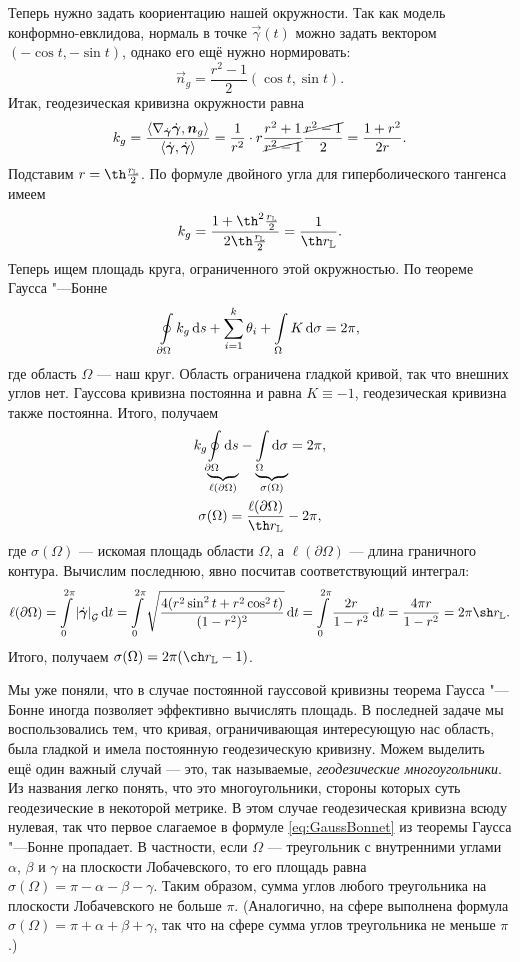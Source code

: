 \begin{solution}
	Теперь нужно задать коориентацию нашей окружности. Так как модель конформно-евклидова, нормаль в точке $\vec{\gamma}(t)$ можно задать вектором $(-\cos t, -\sin t)$, однако его ещё нужно нормировать:
	\[
		\vec{n}_g = \frac{r^2 - 1}{2}(\cos t, \sin t).
	\]
	Итак, геодезическая кривизна окружности равна
	\[
		k_g = \frac{\langle\nabla_{\dot{\vec{\gamma}}}\dot{\vec{\gamma}}, \vec{n}_g \rangle}{\langle\dot{\vec{\gamma}}, \dot{\vec{\gamma}}\rangle} = \frac{1}{r^2} \cdot r\frac{r^2 + 1}{\cancel{r^2 - 1}}\frac{\cancel{r^2 - 1}}{2} = \frac{1 + r^2}{2r}.
	\]
	Подставим $r = \th\frac{r_{\mathbb{L}}}{2}$. По формуле двойного угла для гиперболического тангенса имеем
	\[
		k_g = \frac{1 + \th^2\frac{r_{\mathbb{L}}}{2}}{2\th\frac{r_{\mathbb{L}}}{2}} = \frac{1}{\th r_{\mathbb{L}}}.
	\]
	Теперь ищем площадь круга, ограниченного этой окружностью. По теореме Гаусса "---Бонне
	\[
		\oint\limits_{\partial \Omega}k_g\d s + \sum_{i = 1}^k\theta_i + \int\limits_{\Omega}K\d\sigma = 2\pi,
	\]
	где область $\Omega$ --- наш круг. Область ограничена гладкой кривой, так что внешних углов нет. Гауссова кривизна постоянна и равна $K \equiv -1$, геодезическая кривизна также постоянна. Итого, получаем
	\begin{gather*}
		k_g{\underbrace{\oint\limits_{\partial \Omega}\d s}_{\ell(\partial\Omega)}} - {\underbrace{\int\limits_{\Omega}\d\sigma}_{\sigma(\Omega)}} = 2\pi,\\
		\sigma(\Omega) = \frac{\ell(\partial\Omega)}{\th r_{\mathbb{L}}} - 2\pi,
	\end{gather*}
	где $\sigma(\Omega)$ --- искомая площадь области $\Omega$, а $\ell(\partial\Omega)$ --- длина граничного контура. Вычислим последнюю, явно посчитав соответствующий интеграл:
	\[
		\ell(\partial\Omega) = \int\limits_{0}^{2\pi}\abs{\dot{\vec{\gamma}}}_\G\d t = \int\limits_{0}^{2\pi}\sqrt{\frac{4(r^2\sin^2t + r^2\cos^2t)}{(1 - r^2)^2}}\d t = \int\limits_{0}^{2\pi}\frac{2r}{1 - r^2}\d t = \frac{4\pi r}{1 - r^2} = 2\pi\sh r_{\mathbb{L}}.
	\]
	Итого, получаем $\sigma(\Omega) = 2\pi(\ch r_{\mathbb{L}} - 1)$.
\end{solution}

Мы уже поняли, что в случае постоянной гауссовой кривизны теорема Гаусса "---Бонне иногда позволяет эффективно вычислять площадь. В последней задаче мы воспользовались тем, что кривая, ограничивающая интересующую нас область, была гладкой и имела постоянную геодезическую кривизну. Можем выделить ещё один важный случай --- это, так называемые, \textit{геодезические многоугольники}. Из названия легко понять, что это многоугольники, стороны которых суть геодезические в некоторой метрике. В этом случае геодезическая кривизна всюду нулевая, так что первое слагаемое в формуле \eqref{eq:GaussBonnet} из теоремы Гаусса "---Бонне пропадает. В частности, если $\Omega$ --- треугольник с внутренними углами $\alpha$, $\beta$ и $\gamma$ на плоскости Лобачевского, то его площадь равна $\sigma(\Omega) = \pi - \alpha - \beta - \gamma$. Таким образом, сумма углов любого треугольника на плоскости Лобачевского не больше $\pi$. (Аналогично, на сфере выполнена формула $\sigma(\Omega) = \pi + \alpha + \beta + \gamma$, так что на сфере сумма углов треугольника не меньше $\pi$.)

